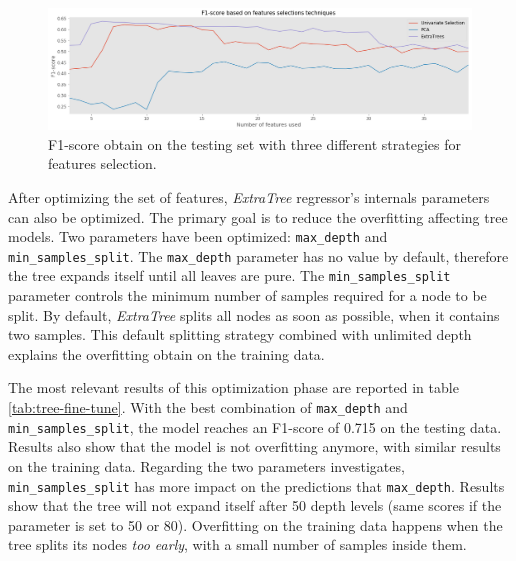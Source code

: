\begin{figure}[htbp]
    \centering
    \includegraphics[width=15cm]{images/feature_selection.png}
    \caption[F1-score based on feature selection]{F1-score obtain on the testing set with three different strategies for features selection.}
    \label{fig:feature-selection}
\end{figure}


After optimizing the set of features, \textit{ExtraTree} regressor's internals parameters can also be optimized. The primary goal is to reduce the overfitting affecting tree models. Two parameters have been optimized: \texttt{max\_depth} and \texttt{min\_samples\_split}. The \texttt{max\_depth} parameter has no value by default, therefore the tree expands itself until all leaves are pure. The \texttt{min\_samples\_split} parameter controls the minimum number of samples required for a node to be split. By default, \textit{ExtraTree} splits all nodes as soon as possible, when it contains two samples. This default splitting strategy combined with unlimited depth explains the overfitting obtain on the training data.

The most relevant results of this optimization phase are reported in table \ref{tab:tree-fine-tune}. With the best combination of \texttt{max\_depth} and \texttt{min\_samples\_split}, the model reaches an F1-score of 0.715 on the testing data. Results also show that the model is not overfitting anymore, with similar results on the training data. Regarding the two parameters investigates, \texttt{min\_samples\_split} has more impact on the predictions that \texttt{max\_depth}. Results show that the tree will not expand itself after 50 depth levels (same scores if the parameter is set to 50 or 80). Overfitting on the training data happens when the tree splits its nodes \textit{too early}, with a small number of samples inside them.


